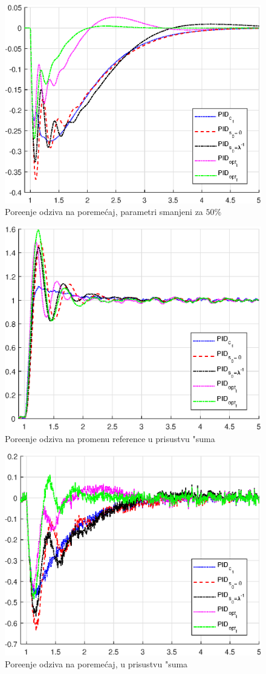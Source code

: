 \documentclass[a4paper,11pt]{article}
\theoremstyle{definition} \newtheorem{deff}{Definicija}[section]
\theoremstyle{definition} \newtheorem{prim}[deff]{Primer}
\theoremstyle{plain} \newtheorem{teor}[deff]{Teorema}
\begin{document}
\begin{figure}[!h]
	\centering
	\includegraphics[width=0.6\linewidth]{slike/fm_comparison_-50.eps}
	\caption{Pore\dj{}enje odziva na poreme\'caj,
	parametri smanjeni za $50\%$}
	\label{fig:fm_-50}
\end{figure}

\begin{figure}[!h]
	\centering
	\includegraphics[width=0.6\linewidth]{slike/Pg_comparison_noise.eps}
	\caption{Pore\dj{}enje odziva na promenu reference u prisustvu "suma}
	\label{fig:Pg_noise}
\end{figure}

\begin{figure}[!h]
	\centering
	\includegraphics[width=0.6\linewidth]{slike/fm_comparison_noise.eps}
	\caption{Pore\dj{}enje odziva na poreme\'caj,
		u prisustvu "suma}
	\label{fig:fm_noise}
\end{figure}
	
\end{document}
